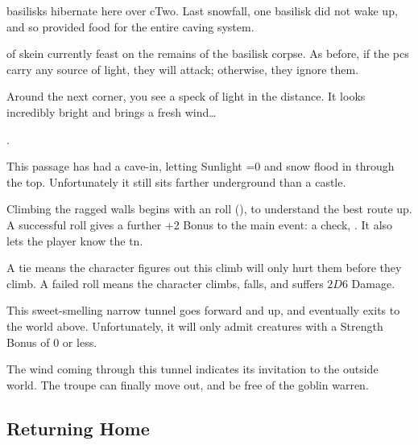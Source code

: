 \begin{multicols}{2}
\else
  \Glspl{basilisk} hibernate here over \gls{cTwo}.
  Last snowfall, one \gls{basilisk} did not wake up, and so provided food for the entire caving system.

   of skein currently feast on the remains of the \gls{basilisk} corpse.
  As before, if the \glspl{pc} carry any source of light, they will attack; otherwise, they ignore them.

  \skeinSwarm

\fi

\begin{boxtext}
  Around the next corner, you see a speck of light in the distance.
  It looks incredibly bright and brings a fresh wind\ldots
\end{boxtext}

.


This passage has had a cave-in, letting Sunlight \ifnum\value{temperature}=0 and snow \fi flood in through the top.
Unfortunately it still sits farther underground than a castle.

Climbing the ragged walls begins with an  roll (\tn[10]), to understand the best route up.
A successful roll gives a further +2 Bonus to the main event: a  check, \tn[14].
It also lets the player know the \gls{tn}.

A tie means the character figures out this climb will only hurt them before they climb.
A failed roll means the character climbs, falls, and suffers $2D6$ Damage.



This sweet-smelling narrow tunnel goes forward and up, and eventually exits to the world above.
Unfortunately, it will only admit creatures with a Strength Bonus of 0 or less.



The wind coming through this tunnel indicates its invitation to the outside world.
The troupe can finally move out, and be free of the goblin warren.

\subsection{Returning Home}


\end{multicols}
